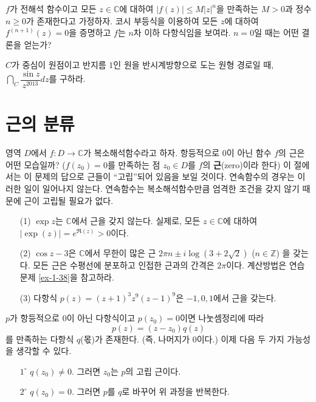 \begin{salt_exercise} \label{ex-4-15}
$f$가 전해석 함수이고 모든 $z\in\mathbb C$에 대하여
$|f(z)| \le M|z|^n$을 만족하는  $M>0$과 정수 $n\ge0$가 존재한다고 가정하자.
코시 부등식을 이용하여 모든 $z$에 대하여 $f^{(n+1)}(z) = 0$을 증명하고
$f$는 $n$차 이하 다항식임을 보여라. $n=0$일 때는 어떤 결론을 얻는가?
\end{salt_exercise}

\begin{salt_exercise} \label{ex-4-16}
$C$가 중심이 원점이고 반지름 $1$인 원을 반시계방향으로 도는 원형 경로일 때,
$\dint_C \dfrac{\sin z}{z^{2013}}dz$를 구하라.
\end{salt_exercise}

\section{근의 분류}

영역 $D$에서  $f: D\to \mathbb C$가 복소해석함수라고 하자.
항등적으로 $0$이 아닌 함수 $f$의 근은 어떤 모습일까?
($f(z_0)=0$를 만족하는 점 $z_0\in D$를 $f$의 {\bf 근}(zero)이라 한다)
이 절에서는 이 문제의 답으로 근들이 ``고립''되어 있음을 보일 것이다.
연속함수의 경우는 이러한 일이 일어나지 않는다. 
연속함수는 복소해석함수만큼 엄격한 조건을 갖지 않기 때문에
근이 고립될 필요가 없다.

\begin{saltexample}[label=example-4-5]{}{}
\begin{itemize}
\item[(1)] $\exp z$는 $\mathbb C$에서 근을 갖지 않는다.
실제로, 모든 $z\in \mathbb C$에 대하여 $|\exp(z)| = e^{\Re(z)} >0$이다.
\item[(2)] $\cos z - 3$은 $\mathbb C$에서 무한이 많은 근 
$2\pi n \pm i \log(3+2\sqrt{2})$ ($n\in\mathbb Z$)
을 갖는다.
모든 근은 수평선에 분포하고 인접한 근과의 간격은 $2\pi$이다.
계산방법은 연습문제 \ref{ex-1-38}을 참고하라.
\item[(3)] 다항식 $p(z) = (z+1)^3z^9(z-1)^9$은 $-1, 0, 1$에서 근을 갖는다. 
\end{itemize}
\end{saltexample}

$p$가 항등적으로 $0$이 아닌 다항식이고 $p(z_0)=0$이면
나눗셈정리에 따라 
\[
p(z) = (z-z_0) q(z)
\]
를 만족하는 다항식 $q$(몫)가 존재한다.
(즉, 나머지가 $0$이다.)
이제 다음 두 가지  가능성을 생각할 수 있다.
\begin{itemize}
\item[$1^\circ$] $q(z_0) \ne0$. 그러면 $z_0$는 $p$의 고립 근이다.
\item[$2^\circ$] $q(z_0) =0$. 그러면 $p$를 $q$로 바꾸어 위 과정을 반복한다.
\end{itemize}

